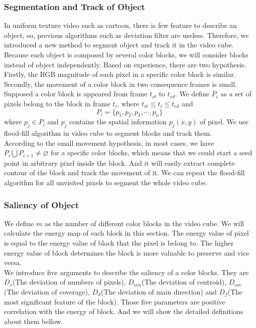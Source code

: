 \documentclass[a4paper, twocolumn]{article}
\begin{document}
			\subsubsection{Segmentation and Track of Object}
			In uniform texture video such as cartoon, there is few feature to describe an object, so, previous algorithms such as deviation filter are useless. Therefore, we introduced a new method to segment object and track it in the video cube.\\
			\linebreak
			Because each object is composed by several color blocks, we will consider blocks instead of object independently. Based on experience, there are two hypothesis. Firstly, the RGB magnitude of each pixel in a specific color block is similar. Secondly, the movement of a color block in two consequence frames is small.\\
			\linebreak
			Supposed a color block is appeared from frame $t_{st}$ to $t_{ed}$. We define $P_i$ as a set of pixels belong to the block in frame $t_i$, where $t_{st} \leqslant t_i \leqslant t_{ed}$ and $$P_i = \{p_1,p_2,p_3,\cdots,p_n\}$$ where $p_j \in P_i$ and $p_j$ contains the spatial information $p_j(x,y)$ of pixel. We use flood-fill algorithm in video cube to segment blocks and track them.\\
			\linebreak
			According to the small movement hypothesis, in most cases, we have $P_i \bigcup P_{i+1} \neq \varnothing $ for a specific color blocks, which means that we could start a seed point in arbitrary pixel inside the block. And it will easily extract complete contour of the block and track the movement of it. We can repeat the flood-fill algorithm for all unvisited pixels to segment the whole video cube.\\
				
			\subsubsection{Saliency of Object}
			We define $m$ as the number of different color blocks in the video cube. We will calculate the energy map of each block in this section. The energy value of pixel is equal to the energy value of block that the pixel is belong to. The higher energy value of block determines the block is more valuable to preserve and vice versa.\\
			\linebreak
			We introduce five arguments to describe the saliency of a color blocks. They are $D_s$(The deviation of numbers of pixels), $D_{cen}$(The deviation of centroid), $D_{cov}$(The deviation of coverage), $D_d$(The deviation of main direction) and $D_f$(The most significant feature of the block). Those five parameters are positive correlation with the energy of block. And we will show the detailed definitions about them bellow.
			
\end{document}
